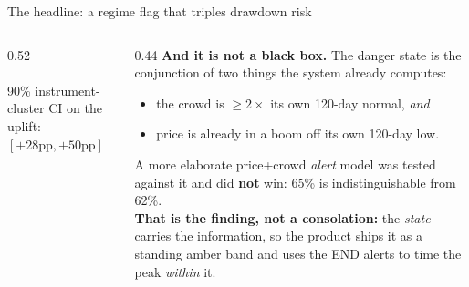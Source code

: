 \documentclass[aspectratio=169,11pt]{beamer}
\begin{document}
\begin{frame}{The headline: a regime flag that triples drawdown risk}
  \begin{columns}[T]
    \begin{column}{0.52\linewidth}
      \vspace{0.4em}
      \\[1.0em]
      \\[1.0em]
      {\scriptsize 90\% instrument-cluster CI on the uplift:
       $[+28\text{pp}, +50\text{pp}]$}
    \end{column}
    \begin{column}{0.44\linewidth}
      \scriptsize
      \textbf{And it is not a black box.} The danger state is the conjunction
      of two things the system already computes:
      \begin{itemize}
        \item the crowd is $\geq 2\times$ its own 120-day normal, \emph{and}
        \item price is already in a boom off its own 120-day low.
      \end{itemize}
      \vspace{0.5em}
      A more elaborate price+crowd \emph{alert} model was tested against it
      and did \textbf{not} win: 65\% is indistinguishable from 62\%.
      \vspace{0.4em}
      \\ \textbf{That is the finding, not a consolation:} the \emph{state}
      carries the information, so the product ships it as a standing amber band
      and uses the END alerts to time the peak \emph{within} it.
    \end{column}
  \end{columns}
\end{frame}
\end{document}
